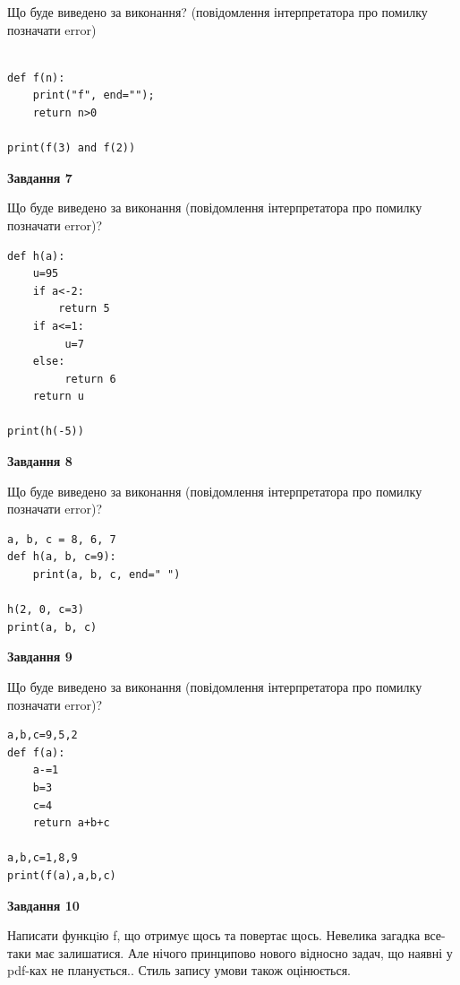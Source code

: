 \documentclass[12pt, ukrainian]{article}
\begin{document}
{\begin {large}
Що буде виведено за виконання? (повідомлення інтерпретатора про помилку позначати error)\par
\begin{verbatim}

def f(n):
    print("f", end="");
    return n>0

print(f(3) and f(2))
\end{verbatim}

{\begin {center}\textbf{Завдання 7}\end {center}}

Що буде виведено за виконання (повідомлення інтерпретатора про помилку позначати error)?\par
\begin{verbatim}
def h(a):
    u=95
    if a<-2: 
        return 5
    if a<=1:
         u=7
    else:
         return 6
    return u

print(h(-5))
\end{verbatim}

{\begin {center}\textbf{Завдання 8}\end {center}}

Що буде виведено за виконання (повідомлення інтерпретатора про помилку позначати error)?\par
\begin{verbatim}
a, b, c = 8, 6, 7
def h(a, b, c=9):
    print(a, b, c, end=" ")

h(2, 0, c=3)
print(a, b, c)
\end{verbatim}

{\begin {center}\textbf{Завдання 9}\end {center}}

Що буде виведено за виконання (повідомлення інтерпретатора про помилку позначати error)?\par
\begin{verbatim}
a,b,c=9,5,2
def f(a):
    a-=1
    b=3
    c=4
    return a+b+c

a,b,c=1,8,9
print(f(a),a,b,c)
\end{verbatim}

{\begin {center}\textbf{Завдання 10}\end {center}}


Написати функцiю f, що отримує щось та повертає щось. Невелика загадка все-таки має залишатися. Але нічого принципово нового відносно задач, що наявні у pdf-ках не планується.. Стиль запису умови також оцінюється.\par
\end {large}}
\newpage
\end{document}
